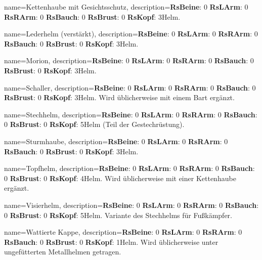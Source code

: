 {
    name={Kettenhaube mit Gesichtsschutz},
    description={\textbf{RsBeine}: 0 \textbf{RsLArm}: 0 \textbf{RsRArm}: 0 \textbf{RsBauch}: 0 \textbf{RsBrust}: 0 \textbf{RsKopf}: 3\newline Helm.}
}


{
    name={Lederhelm (verstärkt)},
    description={\textbf{RsBeine}: 0 \textbf{RsLArm}: 0 \textbf{RsRArm}: 0 \textbf{RsBauch}: 0 \textbf{RsBrust}: 0 \textbf{RsKopf}: 3\newline Helm.}
}


{
    name={Morion},
    description={\textbf{RsBeine}: 0 \textbf{RsLArm}: 0 \textbf{RsRArm}: 0 \textbf{RsBauch}: 0 \textbf{RsBrust}: 0 \textbf{RsKopf}: 3\newline Helm.}
}


{
    name={Schaller},
    description={\textbf{RsBeine}: 0 \textbf{RsLArm}: 0 \textbf{RsRArm}: 0 \textbf{RsBauch}: 0 \textbf{RsBrust}: 0 \textbf{RsKopf}: 3\newline Helm. Wird üblicherweise mit einem Bart ergänzt.}
}


{
    name={Stechhelm},
    description={\textbf{RsBeine}: 0 \textbf{RsLArm}: 0 \textbf{RsRArm}: 0 \textbf{RsBauch}: 0 \textbf{RsBrust}: 0 \textbf{RsKopf}: 5\newline Helm (Teil der Gestechrüstung).}
}


{
    name={Sturmhaube},
    description={\textbf{RsBeine}: 0 \textbf{RsLArm}: 0 \textbf{RsRArm}: 0 \textbf{RsBauch}: 0 \textbf{RsBrust}: 0 \textbf{RsKopf}: 3\newline Helm.}
}


{
    name={Topfhelm},
    description={\textbf{RsBeine}: 0 \textbf{RsLArm}: 0 \textbf{RsRArm}: 0 \textbf{RsBauch}: 0 \textbf{RsBrust}: 0 \textbf{RsKopf}: 4\newline Helm. Wird üblicherweise mit einer Kettenhaube ergänzt.}
}


{
    name={Visierhelm},
    description={\textbf{RsBeine}: 0 \textbf{RsLArm}: 0 \textbf{RsRArm}: 0 \textbf{RsBauch}: 0 \textbf{RsBrust}: 0 \textbf{RsKopf}: 5\newline Helm. Variante des Stechhelms für Fußkämpfer.}
}


{
    name={Wattierte Kappe},
    description={\textbf{RsBeine}: 0 \textbf{RsLArm}: 0 \textbf{RsRArm}: 0 \textbf{RsBauch}: 0 \textbf{RsBrust}: 0 \textbf{RsKopf}: 1\newline Helm. Wird üblicherweise unter ungefütterten Metallhelmen getragen.}
}


